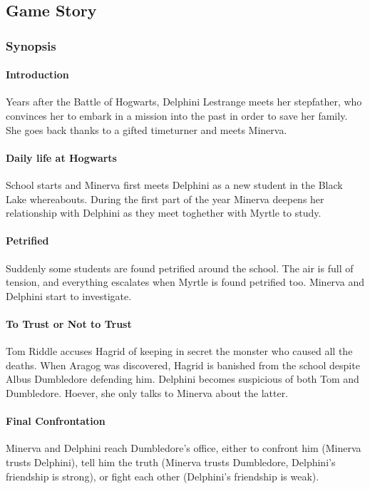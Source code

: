 \subsection{Game Story}

\subsubsection{Synopsis}

\paragraph{Introduction}
Years after the Battle of Hogwarts, Delphini Lestrange meets her stepfather, who convinces her to embark in a mission into the past in order to save her family. She goes back thanks to a gifted timeturner and meets Minerva.

\paragraph{Daily life at Hogwarts}
School starts and Minerva first meets Delphini as a new student in the Black Lake whereabouts. During the first part of the year Minerva deepens her relationship with Delphini as they meet toghether with Myrtle to study.

\paragraph{Petrified}
Suddenly some students are found petrified around the school. The air is full of tension, and everything escalates when Myrtle is found petrified too. Minerva and Delphini start to investigate.

\paragraph{To Trust or Not to Trust}
Tom Riddle accuses Hagrid of keeping in secret the monster who caused all the deaths. When Aragog was discovered, Hagrid is banished from the school despite Albus Dumbledore defending him. Delphini becomes suspicious of both Tom and Dumbledore. Hoever, she only talks to Minerva about the latter.

\paragraph{Final Confrontation}
Minerva and Delphini reach Dumbledore's office, either to confront him (Minerva trusts Delphini), tell him the truth (Minerva trusts Dumbledore, Delphini's friendship is strong), or fight each other (Delphini's friendship is weak).

